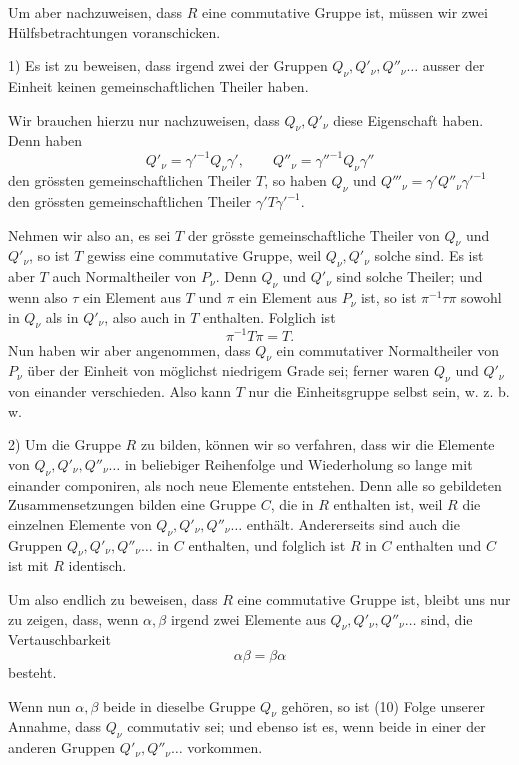 \documentclass[11pt]{article}
\begin{document}
Um aber nachzuweisen, dass $R$ eine commutative Gruppe ist, müssen wir zwei Hülfsbetrachtungen voranschicken.

1) Es ist zu beweisen, dass irgend zwei der Gruppen $Q_\nu,Q'_\nu,Q''_\nu\ldots$ ausser der Einheit keinen gemeinschaftlichen Theiler haben.

Wir brauchen hierzu nur nachzuweisen, dass $Q_\nu,Q'_\nu$ diese Eigenschaft haben. Denn haben
\[
Q'_\nu=\gamma'^{-1}Q_\nu\gamma',
\qquad
Q''_\nu=\gamma''^{-1}Q_\nu\gamma''
\]
den grössten gemeinschaftlichen Theiler $T$, so haben $Q_\nu$ und $Q'''_\nu=\gamma'Q''_\nu\gamma'^{-1}$ den grössten gemeinschaftlichen Theiler $\gamma'T\gamma'^{-1}$.

Nehmen wir also an, es sei $T$ der grösste gemeinschaftliche Theiler von $Q_\nu$ und $Q'_\nu$, so ist $T$ gewiss eine commutative Gruppe, weil $Q_\nu,Q'_\nu$ solche sind. Es ist aber $T$ auch Normaltheiler von $P_\nu$. Denn $Q_\nu$ und $Q'_\nu$ sind solche Theiler; und wenn also $\tau$ ein Element aus $T$ und $\pi$ ein Element aus $P_\nu$ ist, so ist $\pi^{-1}\tau\pi$ sowohl in $Q_\nu$ als in $Q'_\nu$, also auch in $T$ enthalten. Folglich ist
\[
\pi^{-1}T\pi=T.
\]
Nun haben wir aber angenommen, dass $Q_\nu$ ein commutativer Normaltheiler von $P_\nu$ über der Einheit von möglichst niedrigem Grade sei; ferner waren $Q_\nu$ und $Q'_\nu$ von einander verschieden. Also kann $T$ nur die Einheitsgruppe selbst sein, w. z. b. w.

2) Um die Gruppe $R$ zu bilden, können wir so verfahren, dass wir die Elemente von $Q_\nu,Q'_\nu,Q''_\nu\ldots$ in beliebiger Reihenfolge und Wiederholung so lange mit einander componiren, als noch neue Elemente entstehen. Denn alle so gebildeten Zusammensetzungen bilden eine Gruppe $C$, die in $R$ enthalten ist, weil $R$ die einzelnen Elemente von $Q_\nu,Q'_\nu,Q''_\nu\ldots$ enthält. Andererseits sind auch die Gruppen $Q_\nu,Q'_\nu,Q''_\nu\ldots$ in $C$ enthalten, und folglich ist $R$ in $C$ enthalten und $C$ ist mit $R$ identisch.

Um also endlich zu beweisen, dass $R$ eine commutative Gruppe ist, bleibt uns nur zu zeigen, dass, wenn $\alpha,\beta$ irgend zwei Elemente aus $Q_\nu,Q'_\nu,Q''_\nu\ldots$ sind, die Vertauschbarkeit
\begin{equation}
\alpha\beta=\beta\alpha
\tag{10}
\end{equation}
besteht.

Wenn nun $\alpha,\beta$ beide in dieselbe Gruppe $Q_\nu$ gehören, so ist (10) Folge unserer Annahme, dass $Q_\nu$ commutativ sei; und ebenso ist es, wenn beide in einer der anderen Gruppen $Q'_\nu,Q''_\nu\ldots$ vorkommen.
\end{document}
